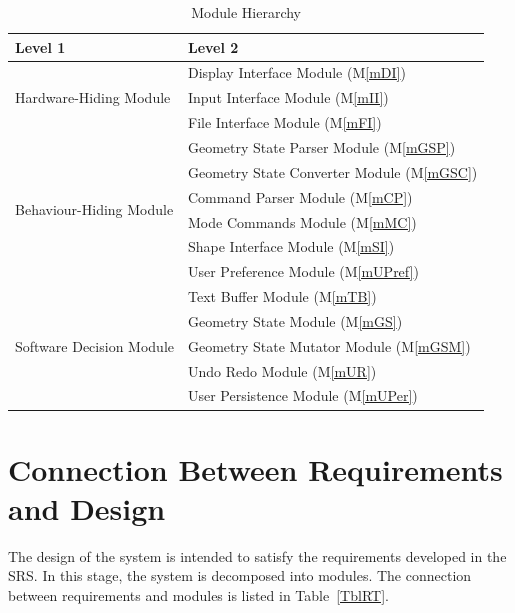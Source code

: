 \documentclass[12pt, titlepage]{article}
\newcommand{\mref}[1]{M\ref{#1}}
\begin{document}
\begin{table}[h!]
\centering
\begin{tabular}{p{} p{}}
\toprule
\textbf{Level 1} & \textbf{Level 2}\\
\midrule

  \multirow{3}{0.3\textwidth}{Hardware-Hiding Module} & {Display Interface Module (\mref{mDI})}\\
  & {Input Interface Module (\mref{mII})}\\
  & {File Interface Module (\mref{mFI})}\\
\midrule

  \multirow{6}{0.3\textwidth}{Behaviour-Hiding Module} & {Geometry State Parser Module (\mref{mGSP})}\\
  & {Geometry State Converter Module (\mref{mGSC})}\\
& {Command Parser Module  (\mref{mCP})}\\
& {Mode Commands Module (\mref{mMC})}\\
& {Shape Interface Module (\mref{mSI})}\\
& {User Preference Module (\mref{mUPref})}\\
\midrule

\multirow{5}{0.3\textwidth}{Software Decision Module} & {Text Buffer Module (\mref{mTB})}\\
& {Geometry State Module (\mref{mGS})}\\
& {Geometry State Mutator Module (\mref{mGSM})}\\
  & {Undo Redo Module (\mref{mUR})}\\
  & {User Persistence Module (\mref{mUPer})}\\
\bottomrule

\end{tabular}
\caption{Module Hierarchy}
\label{TblMH}
\end{table}

\section{Connection Between Requirements and Design} \label{SecConnection}

The design of the system is intended to satisfy the requirements developed in
the SRS. In this stage, the system is decomposed into modules. The connection
between requirements and modules is listed in Table~\ref{TblRT}.
\end{document}
